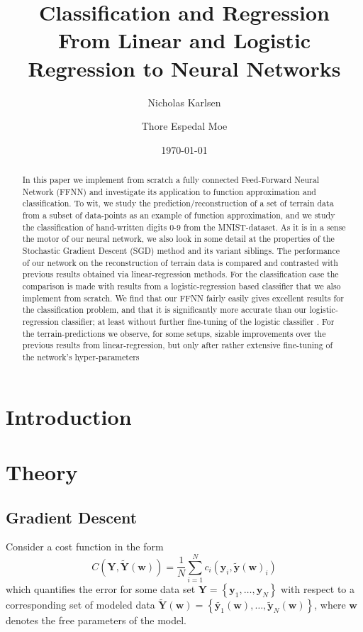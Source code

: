 \documentclass[reprint, english, nofootinbib]{revtex4-2}
\begin{document}
\title{Classification and Regression\\
\normalsize{From Linear and Logistic Regression to Neural Networks}}

\author{Nicholas Karlsen}
\author{Thore Espedal Moe}
\date{\today}

\begin{abstract}
In this paper we implement from scratch a fully connected Feed-Forward Neural Network (FFNN) and investigate its application to function approximation and classification. To wit, we study the prediction/reconstruction of a set of terrain data from a subset of data-points as an example of function approximation, and we study the classification of hand-written digits 0-9 from the MNIST-dataset. As it is in a sense the motor of our neural network, we also look in some detail at the properties of the Stochastic Gradient Descent (SGD) method and its variant siblings. The performance of our network on the reconstruction of terrain data is compared and contrasted with previous results obtained via linear-regression methods. For the classification case the comparison is made with results from a logistic-regression based classifier that we also implement from scratch. We find that our FFNN fairly easily gives excellent results for the classification problem, and that it is significantly more accurate than our logistic-regression classifier; at least without further fine-tuning of the logistic classifier . For the terrain-predictions we observe, for some setups, sizable improvements over the previous results from linear-regression, but only after rather extensive fine-tuning of the network's hyper-parameters

\end{abstract}

\maketitle

\section{Introduction}

\section{Theory}
\subsection{Gradient Descent}
\noindent
Consider a cost function in the form
\begin{equation}
    C(\pmb Y, \tilde{\pmb Y}(\pmb w)) = \frac{1}{N}\sum_{i=1}^{N}c_i(\pmb y_i, \tilde{\pmb y}(\pmb w)_i)
\end{equation}
which quantifies the error for some data set $\pmb Y = \left\{\pmb y_1, \dots, \pmb y_N\right\}$ with respect to a corresponding set of modeled data $\tilde{\pmb Y}(\pmb w) = \left\{\tilde{\pmb y_1}(\pmb w), \dots, \tilde{\pmb y}_N(\pmb w)\right\}$, where $\pmb w$ denotes the free parameters of the model.
\end{document}
